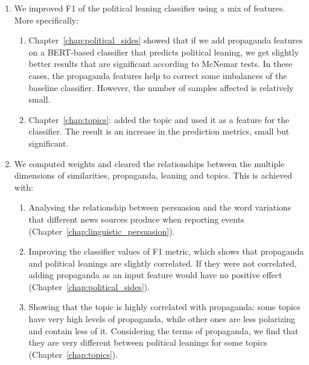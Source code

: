 \begin{enumerate}
    \item We improved F1 of the political leaning classifier using a mix of features.
          More specifically:
          \begin{enumerate}
              \item Chapter~\ref{chap:political_sides} showed that if we add propaganda features on a BERT-based classifier that predicts political leaning, we get slightly better results that are significant according to McNemar tests. In these cases, the propaganda features help to correct some imbalances of the baseline classifier. However, the number of samples affected is relatively small.
              \item Chapter~\ref{chap:topics}: added the topic and used it as a feature for the classifier. The result is an increase in the prediction metrics, small but significant.
          \end{enumerate}
    \item We computed weights and cleared the relationships between the multiple dimensions of similarities, propaganda, leaning and topics. This is achieved with:
          \begin{enumerate}
              \item Analysing the relationship between persuasion and the word variations that different news sources produce when reporting events (Chapter~\ref{chap:linguistic_persuasion}).
              \item Improving the classifier values of F1 metric, which shows that propaganda and political leanings are slightly correlated. If they were not correlated, adding propaganda as an input feature would have no positive effect (Chapter~\ref{chap:political_sides}).
              \item Showing that the topic is highly correlated with propaganda: some topics have very high levels of propaganda, while other ones are less polarizing and contain less of it. Considering the terms of propaganda, we find that they are very different between political leanings for some topics (Chapter~\ref{chap:topics}). %

\end{enumerate}
\end{enumerate}
